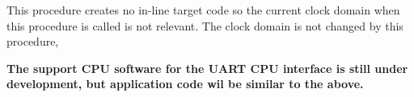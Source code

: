             This procedure creates no in-line target code so the current clock domain
            when this procedure is called is not relevant. The clock domain is not
            changed by this procedure,
            
            {\bf The support CPU software for the UART CPU interface is still
            under development, but application code wil be similar to the
            above.}
